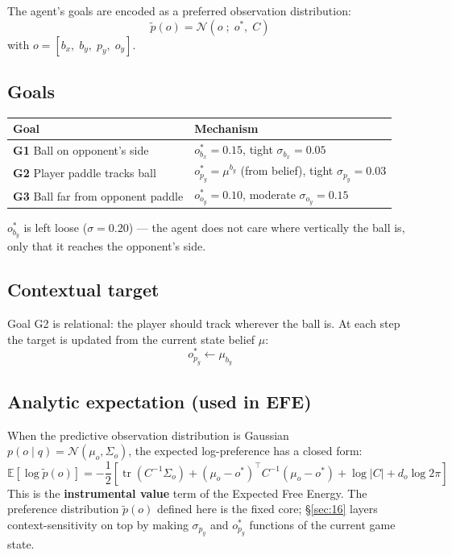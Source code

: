 \documentclass[12pt, a4paper]{article}
\newcommand{\E}{\mathbb{E}}
\newcommand{\1}{\mathbf{1}}
\newcommand{\cN}{\mathcal{N}}
\newcommand{\tr}{\operatorname{tr}}
\begin{document}
The agent's goals are encoded as a preferred observation distribution:
\[
\tilde{p}(o) = \cN(o \;;\; o^*,\; C)
\]
with $o = [b_x,\; b_y,\; p_y,\; o_y]$.

\subsection{Goals}

\begin{table}[ht]
\centering
\begin{tabular}{ll}
\toprule
Goal & Mechanism \\
\midrule
\textbf{G1} Ball on opponent's side &
  $o^*_{b_x} = 0.15$, tight $\sigma_{b_x} = 0.05$ \\
\textbf{G2} Player paddle tracks ball &
  $o^*_{p_y} = \mu^{b_y}$ (from belief), tight $\sigma_{p_y} = 0.03$ \\
\textbf{G3} Ball far from opponent paddle &
  $o^*_{o_y} = 0.10$, moderate $\sigma_{o_y} = 0.15$ \\
\bottomrule
\end{tabular}
\end{table}

$o^*_{b_y}$ is left loose ($\sigma = 0.20$) --- the agent does not care where
vertically the ball is, only that it reaches the opponent's side.

\subsection{Contextual target}

Goal G2 is relational: the player should track wherever the ball is.  At each step
the target is updated from the current state belief $\mu$:
\[
o^*_{p_y} \leftarrow \mu_{b_y}
\]

\subsection{Analytic expectation (used in EFE)}

When the predictive observation distribution is Gaussian
$p(o \mid q) = \cN(\mu_o, \Sigma_o)$, the expected log-preference has a closed
form:
\[
\E[\log\tilde{p}(o)]
= -\frac{1}{2}\left[
  \tr(C^{-1}\Sigma_o) + (\mu_o - o^*)^\top C^{-1}(\mu_o - o^*)
  + \log|C| + d_o\log 2\pi
  \right]
\]
This is the \textbf{instrumental value} term of the Expected Free Energy.  The
preference distribution $\tilde{p}(o)$ defined here is the fixed core;
\S\ref{sec:16} layers context-sensitivity on top by making $\sigma_{p_y}$ and
$o^*_{p_y}$ functions of the current game state.
\end{document}
